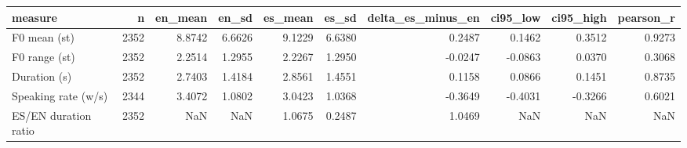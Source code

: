 \begin{tabular}{lrrrrrrrrr}
\toprule
measure & n & en_mean & en_sd & es_mean & es_sd & delta_es_minus_en & ci95_low & ci95_high & pearson_r \\
\midrule
F0 mean (st) & 2352 & 8.8742 & 6.6626 & 9.1229 & 6.6380 & 0.2487 & 0.1462 & 0.3512 & 0.9273 \\
F0 range (st) & 2352 & 2.2514 & 1.2955 & 2.2267 & 1.2950 & -0.0247 & -0.0863 & 0.0370 & 0.3068 \\
Duration (s) & 2352 & 2.7403 & 1.4184 & 2.8561 & 1.4551 & 0.1158 & 0.0866 & 0.1451 & 0.8735 \\
Speaking rate (w/s) & 2344 & 3.4072 & 1.0802 & 3.0423 & 1.0368 & -0.3649 & -0.4031 & -0.3266 & 0.6021 \\
ES/EN duration ratio & 2352 & NaN & NaN & 1.0675 & 0.2487 & 1.0469 & NaN & NaN & NaN \\
\bottomrule
\end{tabular}
